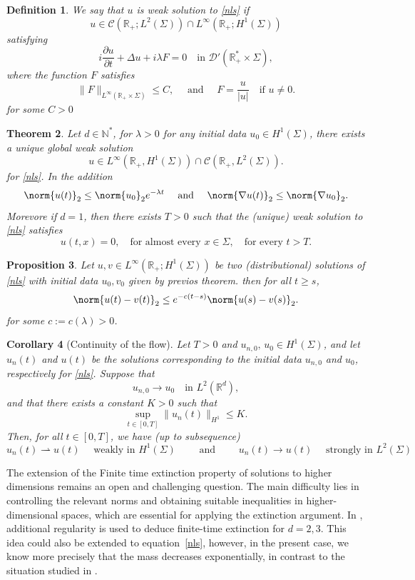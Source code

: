 \documentclass[10pt]{article}
\newtheorem{theorem}{Theorem}[section]
\newtheorem{definition}[theorem]{Definition}
\newtheorem{proposition}[theorem]{Proposition}
\newtheorem{corollary}[theorem]{Corollary}
\begin{document}
 
\begin{definition}
    We say that $u$ is weak solution to \eqref{nls} if
\[
u \in \mathcal{C}(\mathbb{R}_+; L^2(\Sigma)) \cap L^{\infty}(\mathbb{R}_+; H^1(\Sigma))
\]
satisfying
\[
i \frac{\partial u}{\partial t} + \Delta u + i \lambda F=0
\quad \text{in } \mathcal{D}'(\mathbb{R}_+^* \times \Sigma),
\]
where the function $F$ satisfies
\[
\|F\|_{L^{\infty}(\mathbb{R}_+ \times \Sigma)} \le C, \quad\text{ and }\quad F=\dfrac{u}{|u|} \quad\text{if } u \neq 0.
\]
for some $C>0$
\end{definition}
\begin{theorem}\label{1.1}
    Let $d\in \mathbb{N}^*$, for $\lambda>0$ 
for any initial data $u_0 \in H^1(\Sigma)$, there exists a unique global weak solution
\[
u \in L^{\infty}(\mathbb{R}_+,H^1(\Sigma))\cap \mathcal{C}(\mathbb{R}_+,L^2(\Sigma)).
\]
for \eqref{nls}.
In the addition $$\norm{u(t)}_2\leq \norm{u_0}_2e^{-\lambda t} \quad \text{ and }\quad \norm{\nabla u(t)}_2\leq \norm{\nabla u_0}_2.$$
Morevore if $d=1$, then there exists $T > 0$ such that the (unique) weak
solution to \eqref{nls} satisfies
\[
u(t,x) = 0, \quad \text{for almost every } x \in \Sigma, \quad \text{for every } t > T.
\]
\end{theorem}
\begin{proposition}\label{pro}
   Let $u,v \in L^\infty(\mathbb{R}_+;H^1(\Sigma))$ be two (distributional) solutions of \eqref{nls} with initial data $u_0,v_0$ given by previos theorem. then for all $t\geq s$, $$\norm{u(t)-v(t)}_2\leq e^{-c(t-s)}\norm{u(s)-v(s)}_2.$$
   for some $c:=c(\lambda)>0$.
\end{proposition}
\begin{corollary}[Continuity of the flow]\label{flow}
     Let $T>0$ and $u_{n,0},\, u_0 \in H^1(\Sigma)$, and let $u_n(t)$ and $u(t)$ be the solutions corresponding to the initial data $u_{n,0}$ and $u_0$, respectively for \eqref{nls}. Suppose that
\[
u_{n,0} \longrightarrow u_0 \quad \text{in } L^2(\mathbb{R}^d),
\] 
and that there exists a constant $K>0$ such that
\[
\sup_{t \in [0,T]} \|u_n(t)\|_{H^1} \le K.
\] 
Then, for all $t \in [0,T]$, we have (up to subsequence)
\[
u_n(t) \rightharpoonup u(t) \quad \text{ weakly in } H^1(\Sigma) \qquad \text{ and }\qquad u_n(t) \longrightarrow u(t) \quad \text{ strongly in } L^2(\Sigma)
\]
\end{corollary}
The extension of the Finite time extinction property of solutions to higher dimensions 
remains an open and challenging question. 
The main difficulty lies in controlling the relevant norms and obtaining suitable inequalities 
in higher-dimensional spaces, which are essential for applying the extinction argument. 
In \cite{3}, additional regularity is used to deduce finite-time extinction for $d=2,3$. 
This idea could also be extended to equation~\eqref{nls},
however, in the present case, we know more precisely that the mass decreases exponentially, 
in contrast to the situation studied in \cite{3}.
\end{document}
